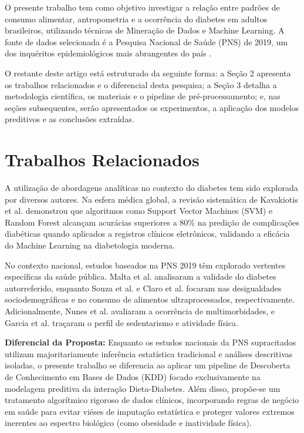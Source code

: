\documentclass[12pt, a4paper]{article}
\begin{document}
    O presente trabalho tem como objetivo investigar a relação entre padrões de consumo alimentar, antropometria e a ocorrência do diabetes em adultos brasileiros, utilizando técnicas de Mineração de Dados e Machine Learning. A fonte de dados selecionada é a Pesquisa Nacional de Saúde (PNS) de 2019, um dos inquéritos epidemiológicos mais abrangentes do país \cite{ibge2020}.

    O restante deste artigo está estruturado da seguinte forma: a Seção 2 apresenta os trabalhos relacionados e o diferencial desta pesquisa; a Seção 3 detalha a metodologia científica, os materiais e o pipeline de pré-processamento; e, nas seções subsequentes, serão apresentados os experimentos, a aplicação dos modelos preditivos e as conclusões extraídas.

    \newpage

    \section{Trabalhos Relacionados}
    A utilização de abordagens analíticas no contexto do diabetes tem sido explorada por diversos autores. Na esfera médica global, a revisão sistemática de Kavakiotis et al. \cite{kavakiotis2017} demonstrou que algoritmos como Support Vector Machines (SVM) e Random Forest alcançam acurácias superiores a 80\% na predição de complicações diabéticas quando aplicados a registros clínicos eletrônicos, validando a eficácia do Machine Learning na diabetologia moderna.

    No contexto nacional, estudos baseados na PNS 2019 têm explorado vertentes específicas da saúde pública. Malta et al. \cite{malta2021} analisaram a validade do diabetes autorreferido, enquanto Souza et al. \cite{souza2021} e Claro et al. \cite{claro2021} focaram nas desigualdades sociodemográficas e no consumo de alimentos ultraprocessados, respectivamente. Adicionalmente, Nunes et al. \cite{nunes2021} avaliaram a ocorrência de multimorbidades, e Garcia et al. \cite{garcia2021} traçaram o perfil de sedentarismo e atividade física.

    \textbf{Diferencial da Proposta:} Enquanto os estudos nacionais da PNS supracitados utilizam majoritariamente inferência estatística tradicional e análises descritivas isoladas, o presente trabalho se diferencia ao aplicar um pipeline de Descoberta de Conhecimento em Bases de Dados (KDD) focado exclusivamente na modelagem preditiva da interação Dieta-Diabetes. Além disso, propõe-se um tratamento algorítmico rigoroso de dados clínicos, incorporando regras de negócio em saúde para evitar viéses de imputação estatística e proteger valores extremos inerentes ao espectro biológico (como obesidade e inatividade física).
\end{document}
